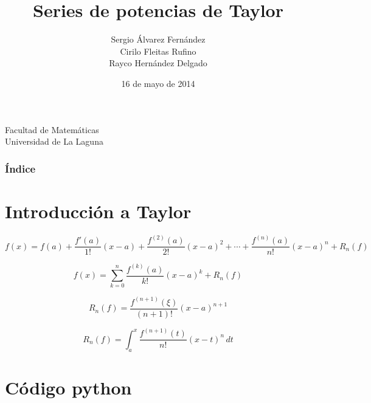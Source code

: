 \documentclass{beamer}
\title[Presentación con Beamer]{Series de potencias de Taylor }
\author[SCR]{Sergio Álvarez Fernández\\Cirilo Fleitas Rufino\\Rayco Hernández Delgado}
\date[16-05-2014]{16 de mayo de 2014}
\begin{document}
  
\begin{frame}

  \titlepage

  \begin{small}
    \begin{center}
     Facultad de Matemáticas \\
     Universidad de La Laguna
    \end{center}
  \end{small}

\end{frame}

\begin{frame}
  \frametitle{Índice}
  \tableofcontents[pausesections]
\end{frame}


\section{Introducción a Taylor}
\begin{frame}

 \[f(x) = f(a)
  + \frac{f'(a)}{1!}(x - a)
  + \frac{f^{(2)}(a)}{2!}(x - a)^2
  + \cdots
  + \frac{f^{(n)}(a)}{n!}(x - a)^n
  + R_n(f)\]
  
\[f(x) = \sum_{k=0}^n \frac{f^{(k)}(a)}{k!}(x - a)^k + R_n(f)\]

\[R_n(f) = \frac{f^{(n+1)}(\xi)}{(n+1)!} (x-a)^{n+1}\]

\[R_n(f) = \int_a^x \frac{f^{(n+1)} (t)}{n!} (x - t)^n \, dt\]

\end{frame}


\section{Código python}

\end{document}
